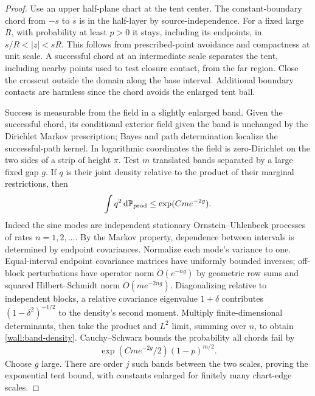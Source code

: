 \begin{proof}
Use an upper half-plane chart at the tent center.  The constant-boundary chord from $-s$ to $s$ is in the half-layer by source-independence.  For a fixed large $R$, with probability at least $p>0$ it stays, including its endpoints, in $s/R<|z|<sR$.  This follows from prescribed-point avoidance and compactness at unit scale.  A successful chord at an intermediate scale separates the tent, including nearby points used to test closure contact, from the far region.  Close the crosscut outside the domain along the base interval.  Additional boundary contacts are harmless since the chord avoids the enlarged tent ball.

Success is measurable from the field in a slightly enlarged band.  Given the successful chord, its conditional exterior field given the band is unchanged by the Dirichlet Markov prescription; Bayes and path determination localize the successful-path kernel.  In logarithmic coordinates the field is zero-Dirichlet on the two sides of a strip of height $\pi$.  Test $m$ translated bands separated by a large fixed gap $g$.  If $q$ is their joint density relative to the product of their marginal restrictions, then
\begin{equation}\label{wall:band-density}
\int q^2\,\mathrm d\mathbb P_{\mathrm{prod}}\le\exp(Cme^{-2g}).
\end{equation}
Indeed the sine modes are independent stationary Ornstein--Uhlenbeck processes of rates $n=1,2,\ldots$.  By the Markov property, dependence between intervals is determined by endpoint covariances.  Normalize each mode's variance to one.  Equal-interval endpoint covariance matrices have uniformly bounded inverses; off-block perturbations have operator norm $O(e^{-ng})$ by geometric row sums and squared Hilbert--Schmidt norm $O(me^{-2ng})$.  Diagonalizing relative to independent blocks, a relative covariance eigenvalue $1+\delta$ contributes $(1-\delta^2)^{-1/2}$ to the density's second moment.  Multiply finite-dimensional determinants, then take the product and $L^2$ limit, summing over $n$, to obtain \eqref{wall:band-density}.  Cauchy--Schwarz bounds the probability all chords fail by
\[
\exp(Cme^{-2g}/2)(1-p)^{m/2}.
\]
Choose $g$ large.  There are order $j$ such bands between the two scales, proving the exponential tent bound, with constants enlarged for finitely many chart-edge scales.


\end{proof}
